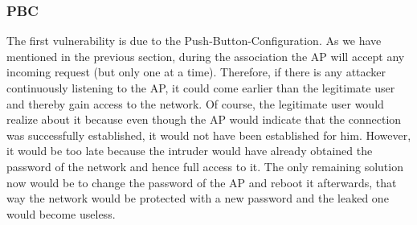 \documentclass[a4paper,11pt]{article}
\begin{document}
\subsubsection{PBC}
The first vulnerability is due to the Push-Button-Configuration. As we have mentioned in the previous section, during the association the AP will accept any incoming request (but only one at a time). Therefore, if there is any attacker continuously listening to the AP, it could come earlier than the legitimate user and thereby gain access to the network. Of course, the legitimate user would realize about it because even though the AP would indicate that the connection was successfully established, it would not have been established for him. However, it would be too late because the intruder would have already obtained the password of the network and hence full access to it. The only remaining solution now would be to change the password of the AP and reboot it afterwards, that way the network would be protected with a new password and the leaked one would become useless.
\end{document}

